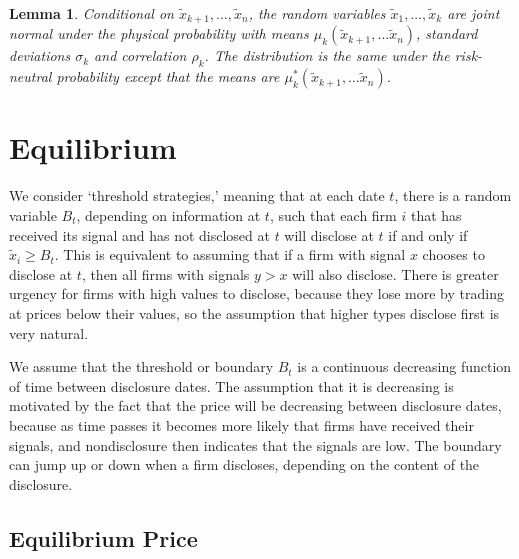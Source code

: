 \documentclass[authoryear,letterpaper,english,12pt]{elsarticle}
\theoremstyle{plain}
\newtheorem{lemma}{Lemma}
\numberwithin{lemma}{section}
\numberwithin{proposition}{section}
\numberwithin{equation}{section}
\numberwithin{figure}{section}
\begin{document}
\begin{lemma}
Conditional on $\tilde x_{k+1}, \ldots, \tilde x_n$, the random variables $\tilde x_{1}, \ldots, \tilde x_k$ are joint normal under the physical probability with means $\mu_k(\tilde x_{k+1}, \ldots \tilde x_n)$, standard deviations $\sigma_k$ and correlation $\rho_k$.  The distribution is the same under the risk-neutral probability except that the means are $\mu^*_{k}(\tilde x_{k+1}, \ldots \tilde x_n)$.
\end{lemma}

\section{Equilibrium}

We consider `threshold strategies,' meaning that at each date $t$, there is a random variable $B_t$, depending on information at $t$, such that each firm $i$ that has received its signal and has not disclosed at $t$ will disclose at $t$ if and only if $\tilde x_i \ge B_t$.  This is equivalent to assuming that if a firm with signal $x$ chooses to disclose at $t$, then all firms with signals $y>x$ will also  disclose.  There is greater urgency for firms with high values to disclose, because they lose more by trading at prices below their values, so the assumption that higher types disclose first is very natural.

We assume that the threshold or boundary $B_t$ is a continuous decreasing function of time between disclosure dates.  The assumption that it is decreasing is motivated by the fact that the price will be decreasing between disclosure dates, because as time passes it becomes more likely that firms have received their signals, and nondisclosure then indicates that the signals are low.  The boundary can jump up or down when a firm discloses, depending on the content of the disclosure.

%
\subsection{Equilibrium Price}
%
\end{document}

